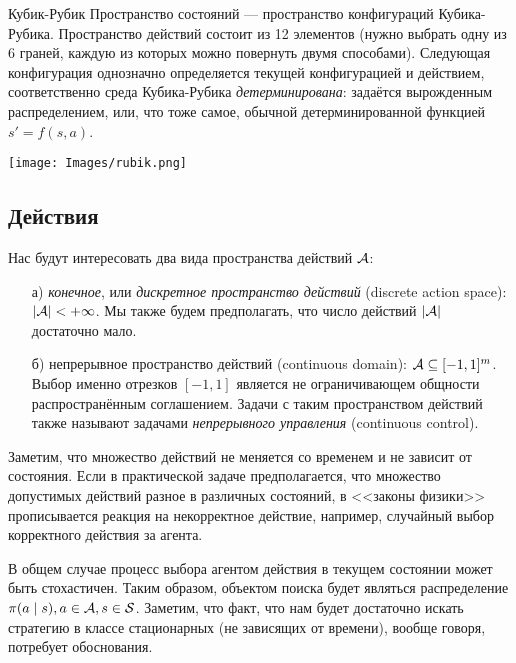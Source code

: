\begin{exampleBox}[righthand ratio=0.15, sidebyside, sidebyside align=center, lower separated=false]{Кубик-Рубик}
Пространство состояний --- пространство конфигураций Кубика-Рубика. Пространство действий состоит из 12 элементов (нужно выбрать одну из 6 граней, каждую из которых можно повернуть двумя способами). Следующая конфигурация однозначно определяется текущей конфигурацией и действием, соответственно среда Кубика-Рубика \emph{детерминирована}: задаётся вырожденным распределением, или, что тоже самое,  обычной детерминированной функцией $s' = f(s, a)$. 

\tcblower
\texttt{[image: Images/rubik.png]}
\end{exampleBox}

\subsection{Действия}

Нас будут интересовать два вида пространства действий $\mathcal{A}$:
\begin{itemize}
    \item[а)] \emph{конечное}, или \emph{дискретное пространство действий} (discrete action space): $|\A| \HM< +\infty$. Мы также будем предполагать, что число действий $|\mathcal{A}|$ достаточно мало.
    \item[б)] непрерывное пространство действий (continuous domain): $\A \HM\subseteq [-1, 1]^m$. Выбор именно отрезков $[-1, 1]$ является не ограничивающем общности распространённым соглашением. Задачи с таким пространством действий также называют задачами \emph{непрерывного управления} (continuous control).
\end{itemize}

\begin{remark}
Заметим, что множество действий не меняется со временем и не зависит от состояния. Если в практической задаче предполагается, что множество допустимых действий разное в различных состояний, в <<законы физики>> прописывается реакция на некорректное действие, например, случайный выбор корректного действия за агента.
\end{remark}

В общем случае процесс выбора агентом действия в текущем состоянии может быть стохастичен. Таким образом, объектом поиска будет являться распределение $\pi(a \mid s), a \HM\in \A, s \HM\in \St$. Заметим, что факт, что нам будет достаточно искать стратегию в классе стационарных (не зависящих от времени), вообще говоря, потребует обоснования.

